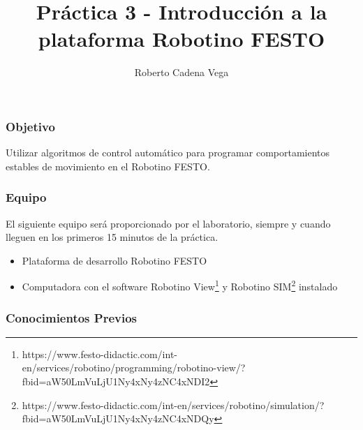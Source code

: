 
\let\oldfootnotesize\footnotesize
\renewcommand*{\footnotesize}{\oldfootnotesize\tiny}
\title{Práctica 3 - Introducción a la plataforma Robotino FESTO}
\author{Roberto Cadena Vega}
\date{}

\beamertemplatenavigationsymbolsempty
\maketitle
\begin{frame}
	\frametitle{Objetivo}
	Utilizar algoritmos de control automático para programar comportamientos estables de movimiento en el Robotino FESTO.
\end{frame}
\begin{frame}
	\frametitle{Equipo}
	El siguiente equipo será proporcionado por el laboratorio, siempre y cuando lleguen en los primeros 15 minutos de la práctica.
	\begin{itemize}
		\item Plataforma de desarrollo Robotino FESTO
		\item Computadora con el software Robotino View\footnote{https://www.festo-didactic.com/int-en/services/robotino/programming/robotino-view/?fbid=aW50LmVuLjU1Ny4xNy4zNC4xNDI2} y Robotino SIM\footnote{https://www.festo-didactic.com/int-en/services/robotino/simulation/?fbid=aW50LmVuLjU1Ny4xNy4zNC4xNDQy} instalado
	\end{itemize}
\end{frame}
\begin{frame}
	\frametitle{Conocimientos Previos}
\end{frame}

